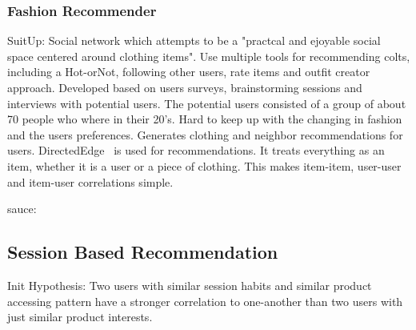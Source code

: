 \subsubsection{Fashion Recommender}

SuitUp:
Social network which attempts to be a "practcal and ejoyable social space centered around clothing items".
Use multiple tools for recommending colts, including a Hot-orNot, following other users, rate items and outfit creator approach.
Developed based on users surveys, brainstorming sessions and interviews with potential users.
The potential users consisted of a group of about 70 people who where in their 20's.
Hard to keep up with the changing in fashion and the users preferences.
Generates clothing and neighbor recommendations for users.
DirectedEdge~\cite{direcetedEdge} is used for recommendations.
It treats everything as an item, whether it is a user or a piece of clothing.
This makes item-item, user-user and item-user correlations simple.


sauce:\cite{SuitUp}








\subsection{Session Based Recommendation}
Init Hypothesis:
Two users with similar session habits and similar product accessing pattern
have a stronger correlation to one-another than two users with just similar
product interests.


